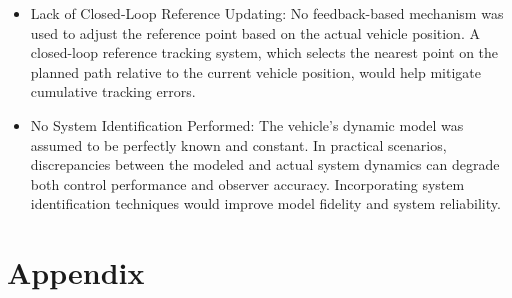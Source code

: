 \documentclass[12pt]{article}
\begin{document}
\begin{itemize}
position for path recalculation, the vehicle's continuous position is approximated to the nearest grid point, 
introducing an additional source of tracking error.
    \item Lack of Closed-Loop Reference Updating:
No feedback-based mechanism was used to adjust the reference point based on the actual vehicle position. 
A closed-loop reference tracking system, which selects the nearest point on the planned path relative to the current 
vehicle position, would help mitigate cumulative tracking errors.
    \item   No System Identification Performed:
The vehicle's dynamic model was assumed to be perfectly known and constant. In practical scenarios, 
discrepancies between the modeled and actual system dynamics can degrade both control performance and observer accuracy. 
Incorporating system identification techniques would improve model fidelity and system reliability.
\end{itemize}

\section{Appendix}
\end{document}
